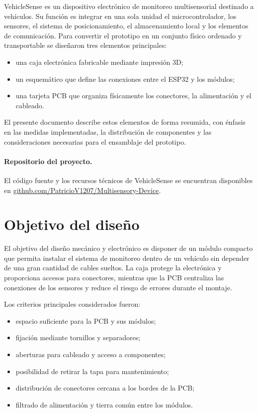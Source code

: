 \documentclass[11pt,a4paper]{article}
\begin{document}
VehicleSense es un dispositivo electrónico de monitoreo multisensorial destinado a
vehículos. Su función es integrar en una sola unidad el microcontrolador, los sensores,
el sistema de posicionamiento, el almacenamiento local y los elementos de comunicación.
Para convertir el prototipo en un conjunto físico ordenado y transportable se diseñaron
tres elementos principales:

\begin{itemize}
    \item una caja electrónica fabricable mediante impresión 3D;
    \item un esquemático que define las conexiones entre el ESP32 y los módulos;
    \item una tarjeta PCB que organiza físicamente los conectores, la alimentación y el cableado.
\end{itemize}

El presente documento describe estos elementos de forma resumida, con énfasis en las
medidas implementadas, la distribución de componentes y las consideraciones necesarias
para el ensamblaje del prototipo.

\paragraph{Repositorio del proyecto.}
El código fuente y los recursos técnicos de VehicleSense se encuentran disponibles en
\href{https://github.com/PatricioV1207/Multisensory-Device}{github.com/PatricioV1207/Multisensory-Device}.

\section{Objetivo del diseño}

El objetivo del diseño mecánico y electrónico es disponer de un módulo compacto que
permita instalar el sistema de monitoreo dentro de un vehículo sin depender de una gran
cantidad de cables sueltos. La caja protege la electrónica y proporciona accesos para
conectores, mientras que la PCB centraliza las conexiones de los sensores y reduce el
riesgo de errores durante el montaje.

Los criterios principales considerados fueron:

\begin{itemize}
    \item espacio suficiente para la PCB y sus módulos;
    \item fijación mediante tornillos y separadores;
    \item aberturas para cableado y acceso a componentes;
    \item posibilidad de retirar la tapa para mantenimiento;
    \item distribución de conectores cercana a los bordes de la PCB;
    \item filtrado de alimentación y tierra común entre los módulos.
\end{itemize}
\end{document}
